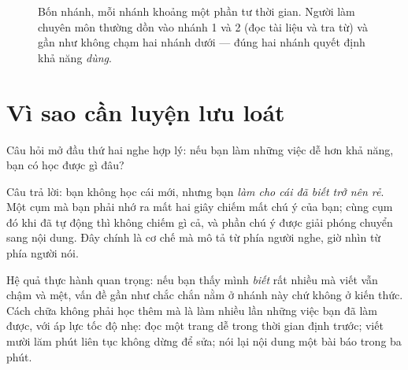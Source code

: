 \documentclass[../../english.tex]{subfiles}
\begin{document}
\begin{figure}[H]\centering
{}
\caption{Bốn nhánh, mỗi nhánh khoảng một phần tư thời gian. Người làm chuyên môn thường dồn vào nhánh 1 và 2 (đọc tài liệu và tra từ) và gần như không chạm hai nhánh dưới --- đúng hai nhánh quyết định khả năng \emph{dùng}.}
\label{fig:bon-nhanh}
\end{figure}

\section{Vì sao cần luyện lưu loát}

Câu hỏi mở đầu thứ hai nghe hợp lý: nếu bạn làm những việc dễ hơn khả năng, bạn có học được gì đâu?

Câu trả lời: bạn không học cái mới, nhưng bạn \emph{làm cho cái đã biết trở nên rẻ}. Một cụm mà bạn phải nhớ ra mất hai giây chiếm mất chú ý của bạn; cùng cụm đó khi đã tự động thì không chiếm gì cả, và phần chú ý được giải phóng chuyển sang nội dung. Đây chính là cơ chế mà  mô tả từ phía người nghe, giờ nhìn từ phía người nói.

Hệ quả thực hành quan trọng: nếu bạn thấy mình \emph{biết} rất nhiều mà viết vẫn chậm và mệt, vấn đề gần như chắc chắn nằm ở nhánh này chứ không ở kiến thức. Cách chữa không phải học thêm mà là làm nhiều lần những việc bạn đã làm được, với áp lực tốc độ nhẹ: đọc một trang dễ trong thời gian định trước; viết mười lăm phút liên tục không dừng để sửa; nói lại nội dung một bài báo trong ba phút.
\end{document}
